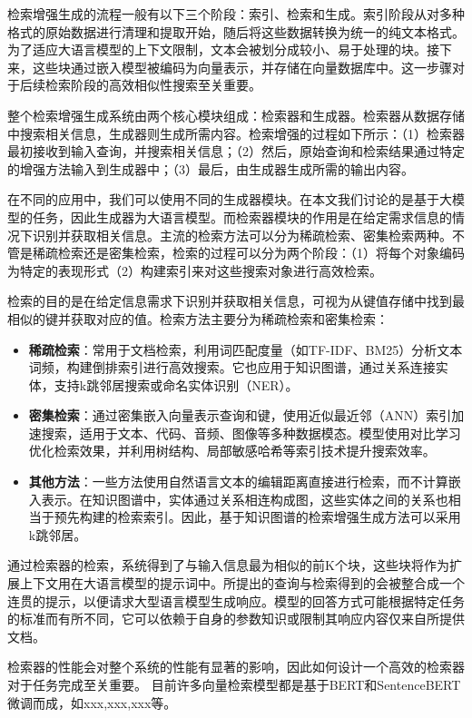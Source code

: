 检索增强生成的流程一般有以下三个阶段：索引、检索和生成。索引阶段从对多种格式的原始数据进行清理和提取开始，随后将这些数据转换为统一的纯文本格式。为了适应大语言模型的上下文限制，文本会被划分成较小、易于处理的块。接下来，这些块通过嵌入模型被编码为向量表示，并存储在向量数据库中。这一步骤对于后续检索阶段的高效相似性搜索至关重要。

整个检索增强生成系统由两个核心模块组成：检索器和生成器。检索器从数据存储中搜索相关信息，生成器则生成所需内容。检索增强的过程如下所示：（1）检索器最初接收到输入查询，并搜索相关信息；（2）然后，原始查询和检索结果通过特定的增强方法输入到生成器中；（3）最后，由生成器生成所需的输出内容。

在不同的应用中，我们可以使用不同的生成器模块。在本文我们讨论的是基于大模型的任务，因此生成器为大语言模型。而检索器模块的作用是在给定需求信息的情况下识别并获取相关信息。主流的检索方法可以分为稀疏检索、密集检索两种。不管是稀疏检索还是密集检索，检索的过程可以分为两个阶段：（1）将每个对象编码为特定的表现形式（2）构建索引来对这些搜索对象进行高效检索。

检索的目的是在给定信息需求下识别并获取相关信息，可视为从键值存储中找到最相似的键并获取对应的值。检索方法主要分为稀疏检索和密集检索：

\begin{itemize}
    \item \textbf{稀疏检索}：常用于文档检索，利用词匹配度量（如TF-IDF、BM25）分析文本词频，构建倒排索引进行高效搜索。它也应用于知识图谱，通过关系连接实体，支持k跳邻居搜索或命名实体识别（NER）。
    \item \textbf{密集检索}：通过密集嵌入向量表示查询和键，使用近似最近邻（ANN）索引加速搜索，适用于文本、代码、音频、图像等多种数据模态。模型使用对比学习优化检索效果，并利用树结构、局部敏感哈希等索引技术提升搜索效率。
    \item \textbf{其他方法}：一些方法使用自然语言文本的编辑距离直接进行检索，而不计算嵌入表示。在知识图谱中，实体通过关系相连构成图，这些实体之间的关系也相当于预先构建的检索索引。因此，基于知识图谱的检索增强生成方法可以采用k跳邻居\cite{Ye2021, Shu2022}。
\end{itemize}

通过检索器的检索，系统得到了与输入信息最为相似的前K个块，这些块将作为扩展上下文用在大语言模型的提示词中。所提出的查询与检索得到的会被整合成一个连贯的提示，以便请求大型语言模型生成响应。模型的回答方式可能根据特定任务的标准而有所不同，它可以依赖于自身的参数知识或限制其响应内容仅来自所提供文档。

检索器的性能会对整个系统的性能有显著的影响，因此如何设计一个高效的检索器对于任务完成至关重要。
目前许多向量检索模型都是基于BERT和SentenceBERT微调而成，如xxx,xxx,xxx等。

